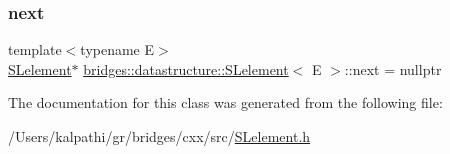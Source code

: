 \subsubsection{\texorpdfstring{next}{next}}
{\footnotesize\ttfamily template$<$typename E$>$ \\
\mbox{\hyperlink{classbridges_1_1datastructure_1_1_s_lelement}{S\+Lelement}}$\ast$ \mbox{\hyperlink{classbridges_1_1datastructure_1_1_s_lelement}{bridges\+::datastructure\+::\+S\+Lelement}}$<$ E $>$\+::next = nullptr\hspace{0.3cm}{\ttfamily [protected]}}



The documentation for this class was generated from the following file\+:\begin{DoxyCompactItemize}
\item 
/\+Users/kalpathi/gr/bridges/cxx/src/\mbox{\hyperlink{_s_lelement_8h}{S\+Lelement.\+h}}\end{DoxyCompactItemize}
